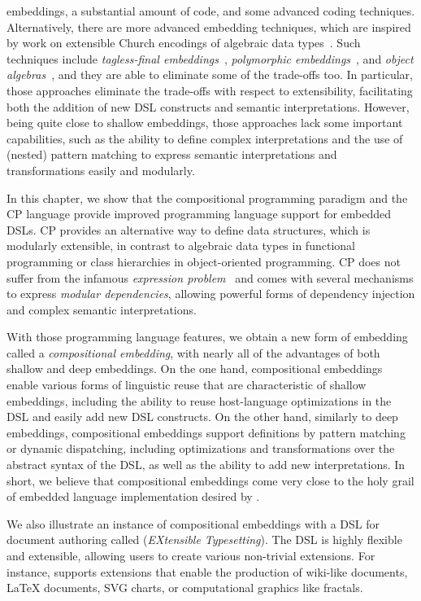 embeddings, a substantial amount of code, and some advanced coding techniques.
Alternatively, there are more advanced embedding techniques, which are inspired
by work on extensible Church encodings of algebraic data
types~\citep{hinze2006generics,oliveira2006extensible,oliveira2009modular}. Such
techniques include \emph{tagless-final
embeddings}~\citep{carette2009finally,kiselyov2010typed}, \emph{polymorphic
embeddings}~\citep{hofer2008polymorphic}, and \emph{object
algebras}~\citep{oliveira2012extensibility}, and they are able to eliminate some
of the trade-offs too. In particular, those approaches eliminate the trade-offs
with respect to extensibility, facilitating both the addition of new DSL
constructs and semantic interpretations. However, being quite close to shallow
embeddings, those approaches lack some important capabilities, such as the
ability to define complex interpretations and the use of (nested) pattern
matching to express semantic interpretations and transformations easily and
modularly.

In this chapter, we show that the compositional programming paradigm and the CP
language provide improved programming language support for embedded DSLs. CP
provides an alternative way to define data structures, which is modularly
extensible, in contrast to algebraic data types in functional programming or
class hierarchies in object-oriented programming. CP does not suffer from the
infamous \emph{expression problem}~\citep{wadler1998expression} and comes with
several mechanisms to express \emph{modular dependencies}, allowing powerful
forms of dependency injection and complex semantic interpretations.

With those programming language features, we obtain a new form of embedding
called a \emph{compositional embedding}, with nearly all of the advantages of
both shallow and deep embeddings. On the one hand, compositional embeddings
enable various forms of linguistic reuse that are characteristic of shallow
embeddings, including the ability to reuse host-language optimizations in the
DSL and easily add new DSL constructs. On the other hand, similarly to deep
embeddings, compositional embeddings support definitions by pattern matching or
dynamic dispatching, including optimizations and transformations over the
abstract syntax of the DSL, as well as the ability to add new interpretations.
In short, we believe that compositional embeddings come very close to the holy
grail of embedded language implementation desired by
\citet{svenningsson2015combining}.

We also illustrate an instance of compositional embeddings with a DSL for
document authoring called \ExT (\emph{EXtensible Typesetting}). The DSL is
highly flexible and extensible, allowing users to create various non-trivial
extensions. For instance, \ExT supports extensions that enable the production of
wiki-like documents, \LaTeX{} documents, SVG charts, or computational graphics
like fractals.
